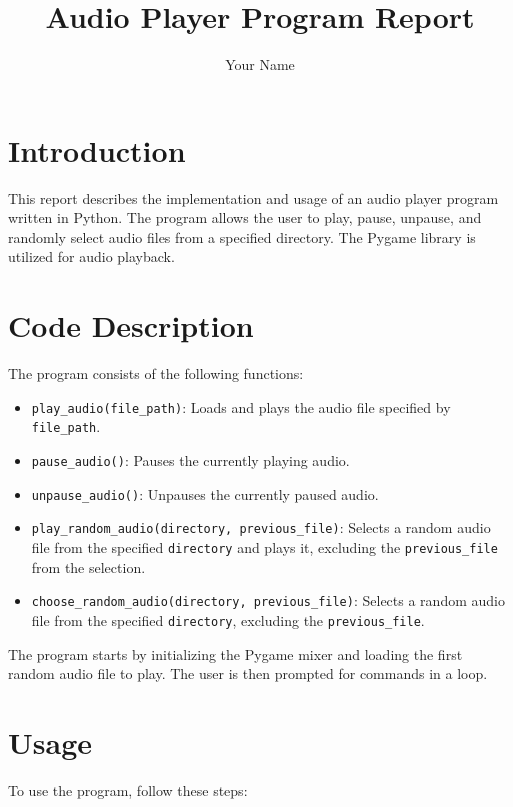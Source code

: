 \documentclass{article}
\begin{document}
\title{Audio Player Program Report}
\author{Your Name}

\maketitle

\section{Introduction}
This report describes the implementation and usage of an audio player program written in Python. The program allows the user to play, pause, unpause, and randomly select audio files from a specified directory. The Pygame library is utilized for audio playback.

\section{Code Description}
The program consists of the following functions:

\begin{itemize}
  \item \texttt{play\_audio(file\_path)}: Loads and plays the audio file specified by \texttt{file\_path}.
  \item \texttt{pause\_audio()}: Pauses the currently playing audio.
  \item \texttt{unpause\_audio()}: Unpauses the currently paused audio.
  \item \texttt{play\_random\_audio(directory, previous\_file)}: Selects a random audio file from the specified \texttt{directory} and plays it, excluding the \texttt{previous\_file} from the selection.
  \item \texttt{choose\_random\_audio(directory, previous\_file)}: Selects a random audio file from the specified \texttt{directory}, excluding the \texttt{previous\_file}.
\end{itemize}

The program starts by initializing the Pygame mixer and loading the first random audio file to play. The user is then prompted for commands in a loop.

\section{Usage}
To use the program, follow these steps:
\end{document}

